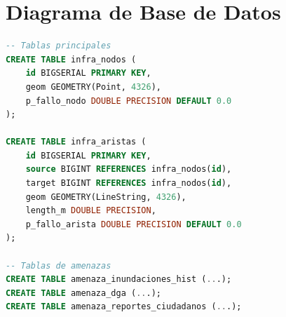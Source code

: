 \documentclass[12pt,a4paper]{article}
\begin{document}
\section{Diagrama de Base de Datos}

\begin{lstlisting}[language=SQL, basicstyle=\small\ttfamily]
-- Tablas principales
CREATE TABLE infra_nodos (
    id BIGSERIAL PRIMARY KEY,
    geom GEOMETRY(Point, 4326),
    p_fallo_nodo DOUBLE PRECISION DEFAULT 0.0
);

CREATE TABLE infra_aristas (
    id BIGSERIAL PRIMARY KEY,
    source BIGINT REFERENCES infra_nodos(id),
    target BIGINT REFERENCES infra_nodos(id),
    geom GEOMETRY(LineString, 4326),
    length_m DOUBLE PRECISION,
    p_fallo_arista DOUBLE PRECISION DEFAULT 0.0
);

-- Tablas de amenazas
CREATE TABLE amenaza_inundaciones_hist (...);
CREATE TABLE amenaza_dga (...);
CREATE TABLE amenaza_reportes_ciudadanos (...);
\end{lstlisting}
\end{document}
